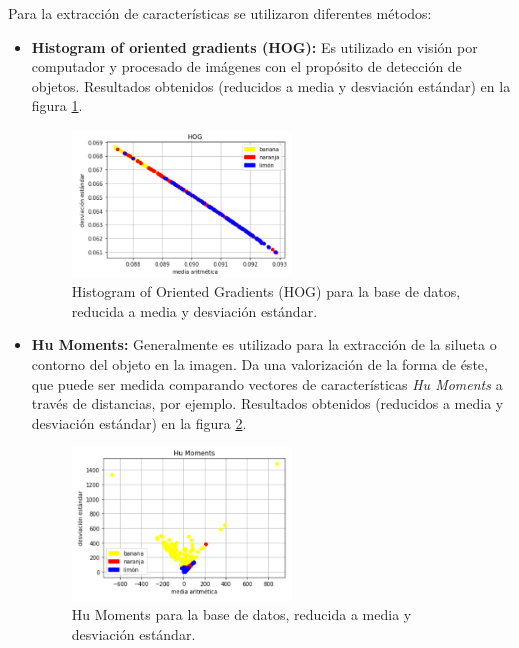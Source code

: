 \documentclass[10pt,a4paper]{article}
\begin{document}
Para la extracción de características se utilizaron diferentes métodos:
\begin{itemize}
\item \textbf{Histogram of oriented gradients (HOG):} Es utilizado en visión por computador y procesado de imágenes con el propósito de detección de objetos. Resultados obtenidos (reducidos a media y desviación estándar) en la figura \ref{hog}.

\begin{figure}[h]
\centering
\includegraphics[width=0.55\textwidth]{imgs/resultado-04_hog.png}
\caption{Histogram of Oriented Gradients (HOG) para la base de datos, reducida a media y desviación estándar.}
\label{hog}
\end{figure}

\item \textbf{Hu Moments:} Generalmente es utilizado para la extracción de la silueta o contorno del objeto en la imagen. Da una valorización de la forma de éste, que puede ser medida comparando vectores de características \textit{Hu Moments} a través de distancias, por ejemplo. Resultados obtenidos (reducidos a media y desviación estándar) en la figura \ref{hu_moments}.

\begin{figure}[h]
\centering
\includegraphics[width=0.55\textwidth]{imgs/resultado-04_hm.png}
\caption{Hu Moments para la base de datos, reducida a media y desviación estándar.}
\label{hu_moments}
\end{figure}


\end{itemize}
\end{document}
